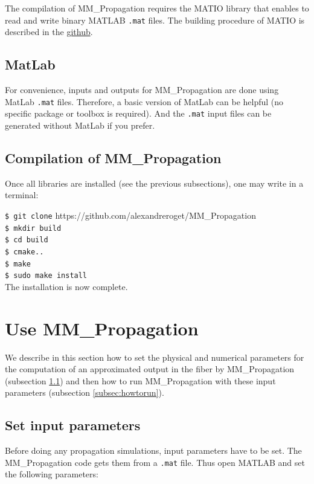 \documentclass[11pt]{amsart}
\newcommand{\name}{{\rm MM\_Propagation }}
\begin{document}
The compilation of \name
requires the MATIO library
that enables to read and write binary MATLAB {\tt .mat} files.
The building procedure of MATIO is described in the \href{https://github.com/tbeu/matio}{github}.

\subsection{MatLab}

For convenience, inputs and outputs for \name
are done using MatLab {\tt .mat} files.
Therefore, a basic version of MatLab can be helpful (no specific package or toolbox is required).
And the {\tt .mat} input files can be generated without MatLab if you prefer.

\subsection{Compilation of MM\_Propagation}
\label{subsec:compilation}
Once all libraries are installed (see the previous subsections), one may write in a terminal:

{\tt \$ git clone} https://github.com/alexandreroget/MM\_Propagation \\
{\tt \$ mkdir build} \\
{\tt \$ cd build} \\
{\tt \$ cmake..} \\
{\tt \$ make} \\
{\tt \$ sudo make install} \\

The installation is now complete.

\section{Use MM\_Propagation}
\label{sec:run}

We describe in this section how to set the physical and numerical parameters for the computation
of an approximated output in the fiber by \name  (subsection \ref{subsec:parameters})
and then how to run \name  with these input parameters (subsection \ref{subsec:howtorun}).


\subsection{Set input parameters}
\label{subsec:parameters}

Before doing any propagation simulations, input parameters have to be set.
The \name code gets them from a {\tt .mat} file. Thus open MATLAB and set the following parameters:
\end{document}
